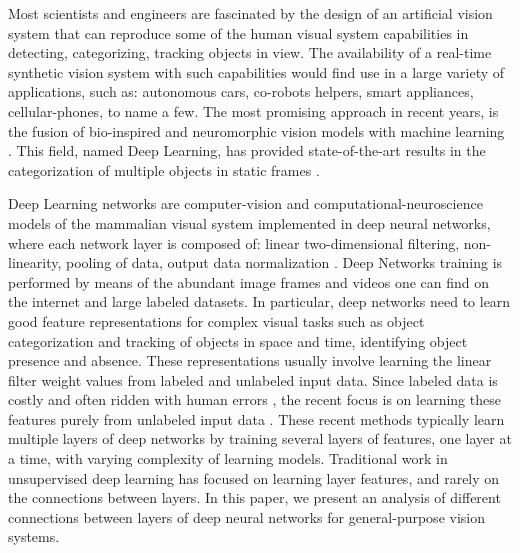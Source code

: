 \documentclass{article} %
\begin{document}
Most scientists and engineers are fascinated by the design of an artificial vision system that can reproduce some of the human visual system capabilities in detecting, categorizing, tracking objects in view. The availability of a real-time synthetic vision system with such capabilities would find use in a large variety of applications, such as: autonomous cars, co-robots helpers, smart appliances, cellular-phones, to name a few. The most promising approach in recent years, is the fusion of bio-inspired and neuromorphic vision models with machine learning \cite{lecun_gradient-based_1998,hadsell_dimensionality_2006,gregor_structured_2011,riesenhuber_hierarchical_1999,serre_feedforward_2007,serre_neuromorphic_2010,jarrett_what_2009,lecun_convolutional_2010,boureau_theoretical_2010}. This field, named Deep Learning, has provided state-of-the-art results in the categorization of multiple objects in static frames \cite{krizhevsky_imagenet_2012}.

Deep Learning networks are computer-vision and computational-neuroscience models of the mammalian visual system implemented in deep neural networks, where each network layer is composed of: linear two-dimensional filtering, non-linearity, pooling of data, output data normalization \cite{jarrett_what_2009,lecun_convolutional_2010,boureau_theoretical_2010}. 
Deep Networks training is performed by means of the abundant image frames and videos one can find on the internet and large labeled datasets. In particular, deep networks need to learn good feature representations for complex visual tasks such as object categorization and tracking of objects in space and time, identifying object presence and absence. These representations usually involve learning the linear filter weight values from labeled and unlabeled input data. Since labeled data is costly and often ridden with human errors \cite{karpathy_lessons_2011, torralba_unbiased_2011, hou_meta-theory_2012}, the recent focus is on learning these features purely from unlabeled input data \cite{olshausen_emergence_1996, hyvarinen_independent_2000, hinton_fast_2006, vincent_extracting_2008, coates_analysis_2011}. These recent methods typically learn multiple layers of deep networks by training several layers of features, one layer at a time, with varying complexity of learning models. Traditional work in unsupervised deep learning has focused on learning layer features, and rarely on the connections between layers. In this paper, we present an analysis of different connections between layers of deep neural networks for general-purpose vision systems. 
\end{document}

